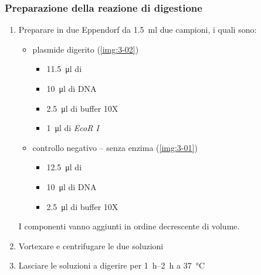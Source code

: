 \subsubsection{Preparazione della reazione di digestione}
\begin{enumerate}
	\item Preparare in due \foreignlanguage{german}{Eppendorf} da \qty{1.5}{\ml} due campioni, i quali sono:
	\begin{itemize}
		\item plasmide digerito (\autoref{img:3-02})
		\begin{itemize}
			\item \qty{11.5}{\micro\litre} di 
			\item \qty{10}{\micro\litre} di DNA
			\item \qty{2.5}{\micro\litre} di buffer 10X
			\item \qty{1}{\micro\litre} di \emph{EcoR I}
		\end{itemize}
		\item controllo negativo -- senza enzima (\autoref{img:3-01})
		\begin{itemize}
			\item \qty{12.5}{\micro\litre} di 
			\item \qty{10}{\micro\litre} di DNA
			\item \qty{2.5}{\micro\litre} di buffer 10X
		\end{itemize}
	\end{itemize}
	I componenti vanno aggiunti in ordine decrescente di volume.
	\item Vortexare e centrifugare le due soluzioni
	\item Lasciare le soluzioni a digerire per \qtyrange{1}{2}{\hour} a \qty{37}{\celsius}
\end{enumerate}


